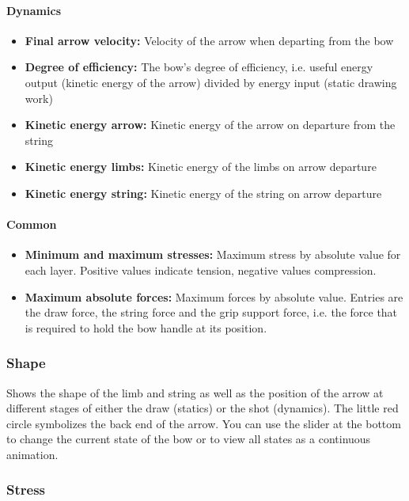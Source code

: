 \documentclass[12pt]{article}
\begin{document}
\paragraph*{Dynamics}

\begin{itemize}
\item \textbf{Final arrow velocity:} Velocity of the arrow when departing from the bow
\item \textbf{Degree of efficiency:} The bow's degree of efficiency, i.e. useful energy output (kinetic energy of the arrow) divided by energy input (static drawing work)
\item \textbf{Kinetic energy arrow:} Kinetic energy of the arrow on departure from the string
\item \textbf{Kinetic energy limbs:} Kinetic energy of the limbs on arrow departure
\item \textbf{Kinetic energy string:} Kinetic energy of the string on arrow departure
\end{itemize}

\paragraph*{Common}

\begin{itemize}
\item \textbf{Minimum and maximum stresses:} Maximum stress by absolute value for each layer.
Positive values indicate tension, negative values compression.
\item \textbf{Maximum absolute forces:} Maximum forces by absolute value. Entries are the draw force, the string force and the grip support force, i.e. the force that is required to hold the bow handle at its position.
\end{itemize}

\subsubsection{Shape}

Shows the shape of the limb and string as well as the position of the arrow at different stages of either the draw (statics) or the shot (dynamics).
The little red circle symbolizes the back end of the arrow.
You can use the slider at the bottom to change the current state of the bow or to view all states as a continuous animation.

\subsubsection{Stress}
\end{document}
